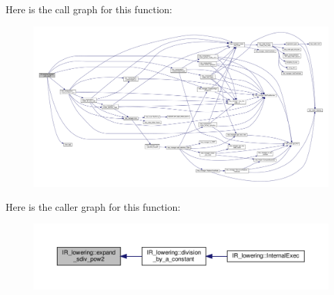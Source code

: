Here is the call graph for this function\+:
\nopagebreak
\begin{figure}[H]
\begin{center}
\leavevmode
\includegraphics[width=350pt]{df/d7d/classIR__lowering_a8f9128221ba101fb76a525f5db6e324a_cgraph}
\end{center}
\end{figure}
Here is the caller graph for this function\+:
\nopagebreak
\begin{figure}[H]
\begin{center}
\leavevmode
\includegraphics[width=350pt]{df/d7d/classIR__lowering_a8f9128221ba101fb76a525f5db6e324a_icgraph}
\end{center}
\end{figure}
\mbox{\label{classIR__lowering_ab4fe755c5983da121948673fbcc4faea}} 
